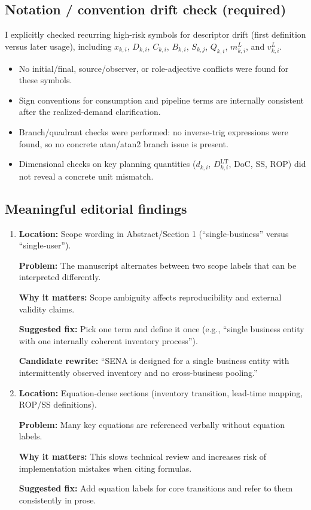 \documentclass[11pt]{article}
\begin{document}
\subsection*{Notation / convention drift check (required)}
I explicitly checked recurring high-risk symbols for descriptor drift (first definition versus later usage), including $x_{k,i}$, $D_{k,i}$, $C_{k,i}$, $B_{k,i}$, $S_{k,j}$, $Q_{k,i}$, $m^L_{k,i}$, and $v^L_{k,i}$.

\begin{itemize}[leftmargin=*]
\item No initial/final, source/observer, or role-adjective conflicts were found for these symbols.
\item Sign conventions for consumption and pipeline terms are internally consistent after the realized-demand clarification.
\item Branch/quadrant checks were performed: no inverse-trig expressions were found, so no concrete atan/atan2 branch issue is present.
\item Dimensional checks on key planning quantities ($d_{k,i}$, $D^{\mathrm{LT}}_{k,i}$, DoC, SS, ROP) did not reveal a concrete unit mismatch.
\end{itemize}

\subsection*{Meaningful editorial findings}
\begin{enumerate}[leftmargin=*]
\item \textbf{Location:} Scope wording in Abstract/Section 1 (``single-business'' versus ``single-user'').

\textbf{Problem:} The manuscript alternates between two scope labels that can be interpreted differently.

\textbf{Why it matters:} Scope ambiguity affects reproducibility and external validity claims.

\textbf{Suggested fix:} Pick one term and define it once (e.g., ``single business entity with one internally coherent inventory process'').

\textbf{Candidate rewrite:} ``SENA is designed for a single business entity with intermittently observed inventory and no cross-business pooling.''

\item \textbf{Location:} Equation-dense sections (inventory transition, lead-time mapping, ROP/SS definitions).

\textbf{Problem:} Many key equations are referenced verbally without equation labels.

\textbf{Why it matters:} This slows technical review and increases risk of implementation mistakes when citing formulas.

\textbf{Suggested fix:} Add equation labels for core transitions and refer to them consistently in prose.
\end{enumerate}
\end{document}

